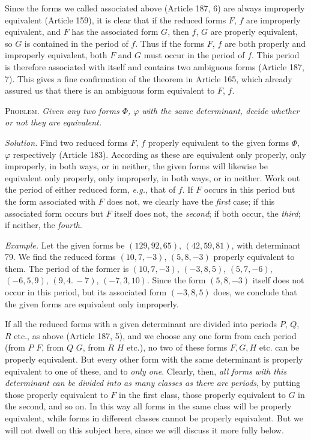 Since the forms we called associated above (Article 187, 6) are always improperly equivalent (Article 159), it is clear that if the reduced forms $F$, $f$ are improperly equivalent, and $F$ has the associated form $G$, then $f$, $G$ are properly equivalent, so $G$ is contained in the period of $f$. Thus if the forms $F$, $f$ are both properly and improperly equivalent, both $F$ and $G$ must occur in the period of $f$. This period is therefore associated with itself and contains two ambiguous forms (Article 187, 7). This gives a fine confirmation of the theorem in Article 165, which already assured us that there is an ambiguous form equivalent to $F$, $f$.

\textsc{Problem.} \textit{Given any two forms $\Phi$, $\varphi$ with the same determinant, decide whether or not they are equivalent.}

\textit{Solution.} Find two reduced forms $F$, $f$ properly equivalent to the given forms $\Phi$, $\varphi$ respectively (Article 183). According as these are equivalent only properly, only improperly, in both ways, or in neither, the given forms will likewise be equivalent only properly, only improperly, in both ways, or in neither. Work out the period of either reduced form, \textit{e.g.}, that of $f$. If $F$ occurs in this period but the form associated with $F$ does not, we clearly have the \textit{first} case; if this associated form occurs but $F$ itself does not, the \textit{second}; if both occur, the \textit{third}; if neither, the \textit{fourth}.

\textit{Example.} Let the given forms be $(129,92,65)$, $(42,59,81)$, with determinant 79. We find the reduced forms $(10,7,-3)$, $(5,8,-3)$ properly equivalent to them. The period of the former is $(10,7,-3)$, $(-3,8,5)$, $(5,7,-6)$, $(-6,5,9)$, $(9,4.\,-7)$, $(-7,3,10)$. Since the form $(5,8,-3)$ itself does not occur in this period,
but its associated form $(-3,8,5)$ does, we conclude that the given forms are equivalent only improperly.

If all the reduced forms with a given determinant are divided into periods $P$, $Q$, $R$ etc., as above (Article 187, 5), and we choose any one form from each period (from $P$ $F$, from $Q$ $G$, from $R$ $H$ etc.), no two of these forms $F,G,H$ etc. can be properly equivalent. But every other form with the same determinant is properly equivalent to one of these, and to \textit{only one}. Clearly, then, \textit{all forms with this determinant can be divided into as many classes as there are periods}, by putting those properly equivalent to $F$ in the first class, those properly equivalent to $G$ in the second, and so on. In this way all forms in the same class will be properly equivalent, while forms in different classes cannot be properly equivalent. But we will not dwell on this subject here, since we will discuss it more fully below.

